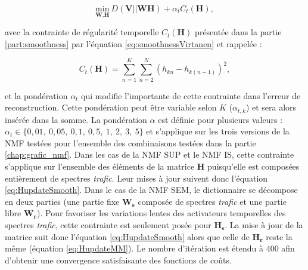\begin{equation}
\underset{\textbf{W},\textbf{H}}{\text{min}}~D\left(\textbf{V} \vert\vert \textbf{WH}\right) + \alpha_t C_t(\mathbf{H}),
\end{equation}


avec la contrainte de régularité temporelle $C_t(\mathbf{H})$ présentée dans la partie \ref{part:smoothness} par l'équation \ref{eq:smoothnessVirtanen} et rappelée : 

\begin{equation}
C_t(\mathbf{H}) = \sum_{n=1}^K \sum_{n=2}^N \left(h_{kn} - h_{k(n-1)}\right)^2,
\end{equation}

et la pondération $\alpha_t$ qui modifie l'importante de cette contrainte dans l'erreur de reconstruction. Cette pondération peut être variable selon $K$ ($\alpha_{t,k}$) et sera alors insérée dans la somme.
La pondération $\alpha$ est définie pour plusieurs valeurs : $\alpha_t \in \lbrace 0,01,~ 0,05,~ 0,1,~ 0,5,~ 1,~2,~3,~5 \rbrace$ et s'applique sur les trois versions de la NMF testées pour l'ensemble des combinaisons testées dans la partie \ref{chap:grafic_nmf}. Dans les cas de la NMF SUP et le NMF IS, cette contrainte s'applique sur l'ensemble des éléments de la matrice $\mathbf{H}$ puisqu'elle est composées entièrement de spectres \textit{trafic}. Leur mises à jour suivent donc l'équation \ref{eq:HupdateSmooth}. Dans le cas de la NMF SEM, le dictionnaire se décompose en deux parties (une partie fixe $\mathbf{W_s}$ composée de spectres \textit{trafic} et une partie libre $\mathbf{W_r}$). Pour favoriser les variations lentes des activateurs temporelles des spectres \textit{trafic}, cette contrainte est seulement posée pour $\mathbf{H_s}$. La mise à jour de la matrice suit donc l'équation \ref{eq:HupdateSmooth} alors que celle de $\mathbf{H_r}$ reste la même (équation \ref{eq:HupdateMM}). Le nombre d'itération est étendu à 400 afin d'obtenir une convergence satisfaisante des fonctions de coûts. 

